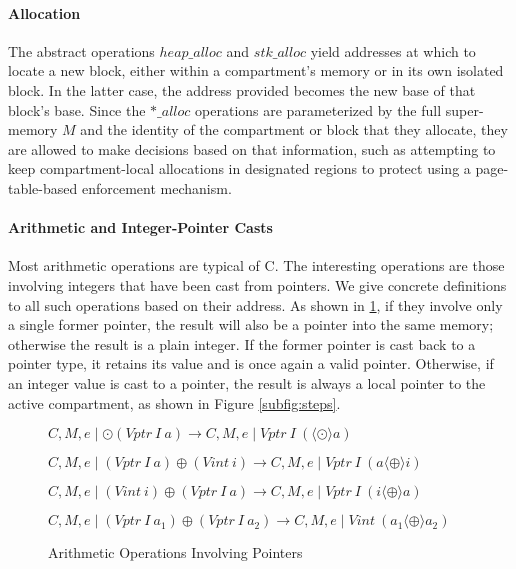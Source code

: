 \documentclass{article}
\begin{document}
\paragraph{Allocation}

The abstract operations \(\mathit{heap\_alloc}\) and \(\mathit{stk\_alloc}\)
yield addresses at which to locate a new block, either within a compartment's memory
or in its own isolated block. In the latter case, the address provided becomes
the new base of that block's base. Since the \(\mathit{*\_alloc}\) operations are
parameterized by the full super-memory \(M\) and the identity of the compartment or block
that they allocate, they are allowed to make decisions based on that
information, such as attempting to keep compartment-local allocations in designated
regions to protect using a page-table-based enforcement mechanism.

\paragraph{Arithmetic and Integer-Pointer Casts}

Most arithmetic operations are typical of C. The interesting operations are those
involving integers that have been cast from pointers. We give concrete definitions
to all such operations based on their address. As shown in \ref{fig:arith}, if they
involve only a single former pointer, the result will also be a pointer into the
same memory; otherwise the result is a plain integer. If the former pointer is cast
back to a pointer type, it retains its value and is once again a valid pointer.
Otherwise, if an integer value is cast to a pointer, the result is always a local
pointer to the active compartment, as shown in Figure \ref{subfig:steps}.

\begin{figure}
  \judgment[Unop]
           {}
           {\(C,M,e \mid \odot (\mathit{Vptr} ~ I ~ a) \longrightarrow
             C,M,e \mid \mathit{Vptr} ~ I ~ (\langle \odot \rangle a)\)}
           
  \judgment[BinopPointerInteger]
           {}
           {\(C,M,e \mid (\mathit{Vptr} ~ I ~ a) \oplus
             (\mathit{Vint} ~ i) \longrightarrow
             C,M,e \mid \mathit{Vptr} ~ I ~ (a \langle \oplus \rangle i)\)}

  \judgment[BinopIntegerPointer]
           {}
           {\(C,M,e \mid (\mathit{Vint} ~ i) \oplus
             (\mathit{Vptr} ~ I ~ a) \longrightarrow
             C,M,e \mid \mathit{Vptr} ~ I ~ (i \langle \oplus \rangle a)\)}

  \judgment[BinopPointers]
           {}
           {\(C,M,e \mid (\mathit{Vptr} ~ I ~ a_1) \oplus
             (\mathit{Vptr} ~ I ~ a_2) \longrightarrow
             C,M,e \mid \mathit{Vint} ~ (a_1 \langle \oplus \rangle a_2)\)}

  \caption{Arithmetic Operations Involving Pointers}
  \label{fig:arith}
\end{figure}
\end{document}
